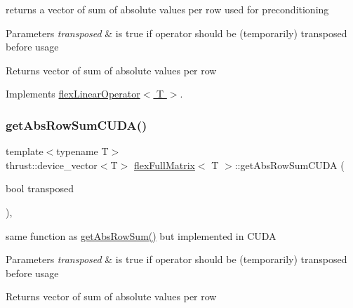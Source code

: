returns a vector of sum of absolute values per row used for preconditioning 


\begin{DoxyParams}{Parameters}
{\em transposed} & is true if operator should be (temporarily) transposed before usage \\
\hline
\end{DoxyParams}
\begin{DoxyReturn}{Returns}
vector of sum of absolute values per row 
\end{DoxyReturn}


Implements \hyperlink{classflex_linear_operator_ad6caa7b09e6e3c401cadef61b8e2307e}{flex\+Linear\+Operator$<$ T $>$}.

\mbox{\label{classflex_full_matrix_af8ade69023e1c5140a82ad3583a8acb6}} 
\subsubsection{\texorpdfstring{get\+Abs\+Row\+Sum\+C\+U\+D\+A()}{getAbsRowSumCUDA()}}
{\footnotesize\ttfamily template$<$typename T$>$ \\
thrust\+::device\+\_\+vector$<$T$>$ \hyperlink{classflex_full_matrix}{flex\+Full\+Matrix}$<$ T $>$\+::get\+Abs\+Row\+Sum\+C\+U\+DA (\begin{DoxyParamCaption}\item[{bool}]{transposed }\end{DoxyParamCaption})\hspace{0.3cm}{\ttfamily [inline]}, {\ttfamily [virtual]}}



same function as \hyperlink{classflex_full_matrix_a911d6b2a452edb8233f56c1e5250855e}{get\+Abs\+Row\+Sum()} but implemented in C\+U\+DA 


\begin{DoxyParams}{Parameters}
{\em transposed} & is true if operator should be (temporarily) transposed before usage \\
\hline
\end{DoxyParams}
\begin{DoxyReturn}{Returns}
vector of sum of absolute values per row 
\end{DoxyReturn}


